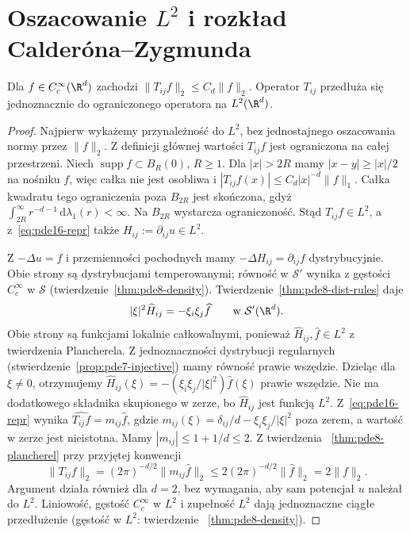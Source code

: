 \section[Oszacowanie Hilbertowskie i rozkład Calderóna--Zygmunda]{Oszacowanie $L^2$ i rozkład Calderóna--Zygmunda}
\begin{lemat}[Oszacowanie w $L^2$]
\label{lem:pde16-l2}
Dla $f\in C_c^\infty(\R^d)$ zachodzi
$\|T_{ij}f\|_2\le C_d\|f\|_2$. Operator $T_{ij}$
przedłuża się jednoznacznie do ograniczonego operatora na
$L^2(\R^d)$.
\end{lemat}
\begin{proof}
Najpierw wykażemy przynależność do $L^2$, bez jednostajnego
oszacowania normy przez $\|f\|_2$. Z definicji głównej
wartości $T_{ij}f$ jest ograniczona na całej przestrzeni.
Niech $\operatorname{supp}f\subset B_R(0)$, $R\ge1$.
Dla $|x|>2R$ mamy $|x-y|\ge|x|/2$ na nośniku $f$,
więc całka nie jest osobliwa i
$|T_{ij}f(x)|\le C_d|x|^{-d}\|f\|_1$.
Całka kwadratu tego ograniczenia poza $B_{2R}$ jest
skończona, gdyż $\int_{2R}^\infty r^{-d-1}
\,\mathrm d\lambda_1(r)<\infty$.
Na $B_{2R}$ wystarcza ograniczoność. Stąd $T_{ij}f\in L^2$,
a z~\eqref{eq:pde16-repr} także $H_{ij}:=\partial_{ij}u\in L^2$.

Z $-\Delta u=f$ i przemienności pochodnych mamy
$-\Delta H_{ij}=\partial_{ij}f$ dystrybucyjnie.
Obie strony są dystrybucjami temperowanymi; równość
w $\mathcal S'$ wynika z gęstości $C_c^\infty$ w $\mathcal S$
(twierdzenie~\ref{thm:pde8-density}). Twierdzenie~\ref{thm:pde8-dist-rules} daje
\[
 |\xi|^2\widehat H_{ij}=-\xi_i\xi_j\widehat f
 \qquad\text{w }\mathcal S'(\R^d).
\]
Obie strony są funkcjami lokalnie całkowalnymi, ponieważ
$\widehat H_{ij},\widehat f\in L^2$ z twierdzenia
Plancherela. Z jednoznaczności dystrybucji regularnych
(stwierdzenie~\ref{prop:pde7-injective}) mamy równość
prawie wszędzie. Dzieląc dla $\xi\ne0$, otrzymujemy
$\widehat H_{ij}(\xi)=-(\xi_i\xi_j/|\xi|^2)\widehat f(\xi)$
prawie wszędzie. Nie ma dodatkowego składnika skupionego
w zerze, bo $\widehat H_{ij}$ jest funkcją $L^2$.
Z~\eqref{eq:pde16-repr} wynika
$\widehat{T_{ij}f}=m_{ij}\widehat f$, gdzie
$m_{ij}(\xi)=\delta_{ij}/d-\xi_i\xi_j/|\xi|^2$
poza zerem, a wartość w zerze jest nieistotna.
Mamy $|m_{ij}|\le1+1/d\le2$. Z twierdzenia
~\ref{thm:pde8-plancherel} przy przyjętej konwencji
\[
 \|T_{ij}f\|_2=(2\pi)^{-d/2}\|m_{ij}\widehat f\|_2
 \le 2(2\pi)^{-d/2}\|\widehat f\|_2=2\|f\|_2.
\]
Argument działa również dla $d=2$, bez wymagania, aby
sam potencjał $u$ należał do $L^2$. Liniowość, gęstość
$C_c^\infty$ w $L^2$ i zupełność $L^2$ dają jednoznaczne
ciągłe przedłużenie (gęstość w $L^2$: twierdzenie
~\ref{thm:pde8-density}).
\end{proof}

